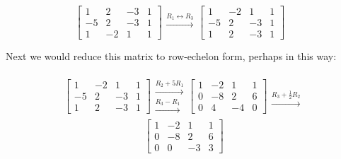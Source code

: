 \documentclass{ximera}
\begin{document}
\begin{exploration}
$$\left[\begin{array}{ccc|c}  
 1&2&-3&1\\-5&2&-3&1\\1&-2&1&1
 \end{array}\right]
 \begin{array}{c}
 \\
 \xrightarrow{R_1\leftrightarrow R_3}\\
\\
 \end{array}
\left[\begin{array}{ccc|c}  
 1&-2&1&1\\-5&2&-3&1\\1&2&-3&1
 \end{array}\right]
 \begin{array}{c}
 \\
\\
\\
 \end{array}$$

Next we would reduce this matrix to row-echelon form, perhaps in this way:

$$\left[\begin{array}{ccc|c}  
 1&-2&1&1\\-5&2&-3&1\\1&2&-3&1
 \end{array}\right]
 \begin{array}{c}
 \\
 \xrightarrow{R_2+5R_1}\\
 \xrightarrow{R_3-R_1}\\
 \end{array}
\left[\begin{array}{ccc|c}  
 1&-2&1&1\\0&-8&2&6\\0&4&-4&0
 \end{array}\right]
 \begin{array}{c}
 \\
 \\
 \xrightarrow{R_3+\frac{1}{2}R_2}\\
 \end{array}
$$
\begin{equation}\label{eq:ref2}
 \left[\begin{array}{ccc|c}  
 1&-2&1&1\\0&-8&2&6\\0&0&-3&3
 \end{array}\right]
\end{equation}


\end{exploration}
\end{document}
